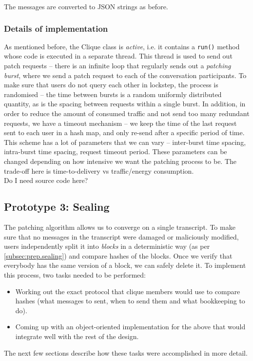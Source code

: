 \documentclass[a4paper, 12pt]{report}
\begin{document}
The messages are converted to JSON strings as before.


\subsubsection{Details of implementation}
As mentioned before, the Clique class is \emph{active}, i.e. it contains a \texttt{run()} method whose code is executed in a separate thread. This thread is used to send out patch requests -- there is an infinite loop that regularly sends out a \emph{patching burst}, where we send a patch request to each of the conversation participants. To make sure that users do not query each other in lockstep, the process is randomised -- the time between bursts is a random uniformly distributed quantity, as is the spacing between requests within a single burst. In addition, in order to reduce the amount of consumed traffic and not send too many redundant requests, we have a timeout mechanism -- we keep the time of the last request sent to each user in a hash map, and only re-send after a specific period of time. \\

This scheme has a lot of parameters that we can vary -- inter-burst time spacing, intra-burst time spacing, request timeout period. These parameters can be changed depending on how intensive we want the patching process to be. The trade-off here is time-to-delivery vs traffic/energy consumption. \\

{\color{red} Do I need source code here?}


\subsection{Prototype 3: Sealing}
\label{subsec:impl.proto.sealing}
The patching algorithm allows us to converge on a single transcript. To make sure that no messages in the transcript were damaged or maliciously modified, users independently split it into \emph{blocks} in a deterministic way (as per \cref{subsec:prep.sealing}) and compare hashes of the blocks. Once we verify that everybody has the same version of a block, we can safely delete it. To implement this process, two tasks needed to be performed:

\begin{itemize}
    \item Working out the exact protocol that clique members would use to compare hashes (what messages to sent, when to send them and what bookkeeping to do).
    \item Coming up with an object-oriented implementation for the above that would integrate well with the rest of the design.
\end{itemize}
The next few sections describe how these tasks were accomplished in more detail.
\end{document}
